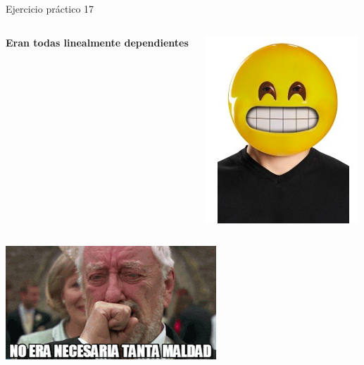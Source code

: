 \documentclass{bredelebeamer}
\begin{document}
\begin{frame}{Ejercicio práctico 17}
\begin{columns}
\begin{column}{0.6\textwidth}
\begin{center}
\textbf{Eran todas linealmente dependientes }
\end{center}
\end{column}
\begin{column}{0.3\textwidth}
\begin{center}
\includegraphics[scale=0.3]{images/img45.png}
\end{center}
\end{column}
\end{columns}
\begin{center}
\includegraphics[scale=0.6]{images/img42.png}
\end{center}
\end{frame}
\end{document}
